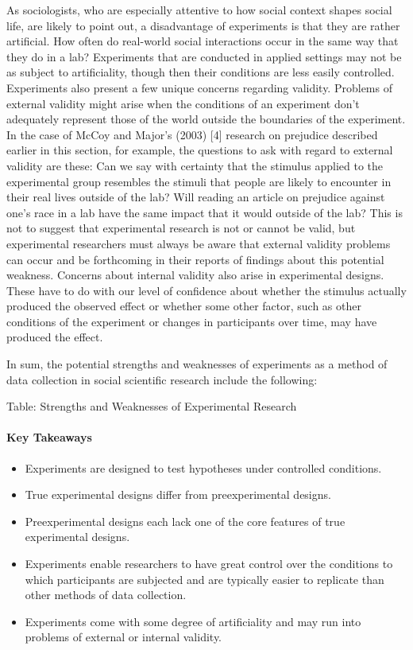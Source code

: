 As sociologists, who are especially attentive to how social context shapes social life, are likely to point out, a disadvantage of experiments is that they are rather artificial. How often do real-world social interactions occur in the same way that they do in a lab? Experiments that are conducted in applied settings may not be as subject to artificiality, though then their conditions are less easily controlled. Experiments also present a few unique concerns regarding validity. Problems of external validity might arise when the conditions of an experiment don’t adequately represent those of the world outside the boundaries of the experiment. In the case of McCoy and Major’s (2003) [4] research on prejudice described earlier in this section, for example, the questions to ask with regard to external validity are these: Can we say with certainty that the stimulus applied to the experimental group resembles the stimuli that people are likely to encounter in their real lives outside of the lab? Will reading an article on prejudice against one’s race in a lab have the same impact that it would outside of the lab? This is not to suggest that experimental research is not or cannot be valid, but experimental researchers must always be aware that external validity problems can occur and be forthcoming in their reports of findings about this potential weakness. Concerns about internal validity also arise in experimental designs. These have to do with our level of confidence about whether the stimulus actually produced the observed effect or whether some other factor, such as other conditions of the experiment or changes in participants over time, may have produced the effect.

In sum, the potential strengths and weaknesses of experiments as a method of data collection in social scientific research include the following:

Table: Strengths and Weaknesses of Experimental Research

\paragraph{Key Takeaways}

\begin{itemize}
	\setlength{\itemsep}{0pt}
	\setlength{\parskip}{0pt}
	\setlength{\parsep}{0pt}
	
	\item Experiments are designed to test hypotheses under controlled conditions.
	\item True experimental designs differ from preexperimental designs.
	\item Preexperimental designs each lack one of the core features of true experimental designs.
	\item Experiments enable researchers to have great control over the conditions to which participants are subjected and are typically easier to replicate than other methods of data collection.
	\item Experiments come with some degree of artificiality and may run into problems of external or internal validity.
	
\end{itemize}


